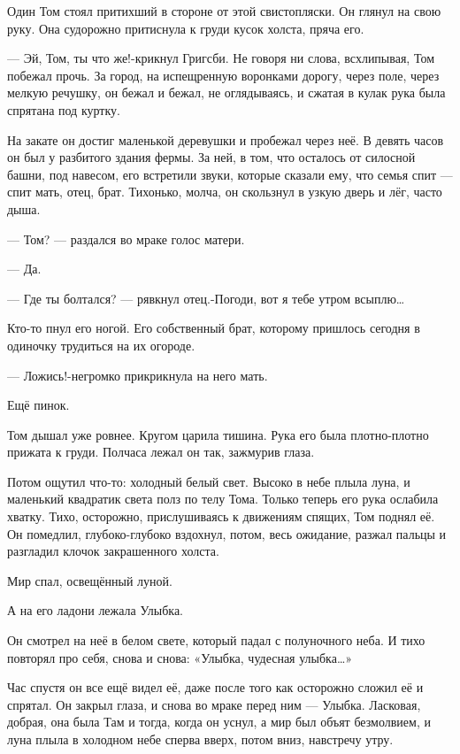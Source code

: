 Один Том стоял притихший в стороне от этой свистопляски. Он глянул на свою
руку. Она судорожно притиснула к груди кусок холста, пряча его.

— Эй, Том, ты что же!-крикнул Григсби. Не говоря ни слова, всхлипывая, Том
побежал прочь. За город, на испещренную воронками дорогу, через поле, через
мелкую речушку, он бежал и бежал, не оглядываясь, и сжатая в кулак рука была
спрятана под куртку.

На закате он достиг маленькой деревушки и пробежал через неё. В девять часов он
был у разбитого здания фермы. За ней, в том, что осталось от силосной башни,
под навесом, его встретили звуки, которые сказали ему, что семья спит — спит
мать, отец, брат. Тихонько, молча, он скользнул в узкую дверь и лёг, часто
дыша.

— Том? — раздался во мраке голос матери.

— Да.

— Где ты болтался? — рявкнул отец.-Погоди, вот я тебе утром всыплю…

Кто-то пнул его ногой. Его собственный брат, которому пришлось сегодня в
одиночку трудиться на их огороде.

— Ложись!-негромко прикрикнула на него мать.

Ещё пинок.

Том дышал уже ровнее. Кругом царила тишина. Рука его была плотно-плотно прижата
к груди. Полчаса лежал он так, зажмурив глаза.

Потом ощутил что-то: холодный белый свет. Высоко в небе плыла луна, и маленький
квадратик света полз по телу Тома. Только теперь его рука ослабила хватку.
Тихо, осторожно, прислушиваясь к движениям спящих, Том поднял её. Он помедлил,
глубоко-глубоко вздохнул, потом, весь ожидание, разжал пальцы и разгладил
клочок закрашенного холста.

Мир спал, освещённый луной.

А на его ладони лежала Улыбка.

Он смотрел на неё в белом свете, который падал с полуночного неба. И тихо
повторял про себя, снова и снова: «Улыбка, чудесная улыбка…»

Час спустя он все ещё видел её, даже после того как осторожно сложил её и
спрятал. Он закрыл глаза, и снова во мраке перед ним — Улыбка. Ласковая,
добрая, она была Там и тогда, когда он уснул, а мир был объят безмолвием, и
луна плыла в холодном небе сперва вверх, потом вниз, навстречу утру.
